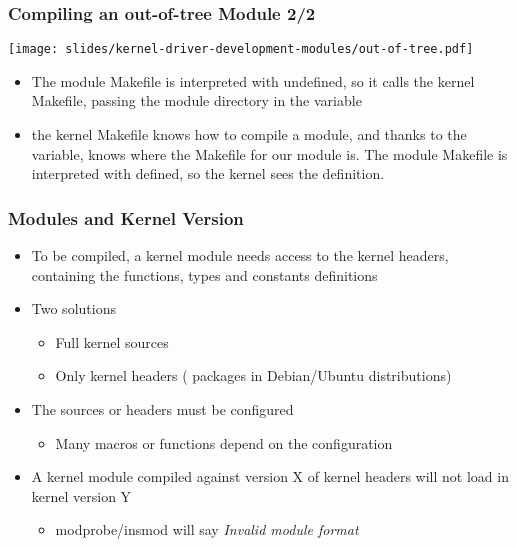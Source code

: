 \begin{frame}
  \frametitle{Compiling an out-of-tree Module 2/2}
  \begin{center}
    \texttt{[image: slides/kernel-driver-development-modules/out-of-tree.pdf]}
  \end{center}
  \begin{itemize}
  \item The module Makefile is interpreted with 
    undefined, so it calls the kernel Makefile, passing the module
    directory in the  variable
  \item the kernel Makefile knows how to compile a module, and thanks
    to the  variable, knows where the Makefile for our module
    is. The module Makefile is interpreted with 
    defined, so the kernel sees the  definition.
  \end{itemize}
\end{frame}

\begin{frame}
  \frametitle{Modules and Kernel Version}
  \begin{itemize}
  \item To be compiled, a kernel module needs access to the kernel
    headers, containing the functions, types and constants definitions
  \item Two solutions
    \begin{itemize}
    \item Full kernel sources
    \item Only kernel headers ( packages in
      Debian/Ubuntu distributions)
    \end{itemize}
  \item The sources or headers must be configured
    \begin{itemize}
    \item Many macros or functions depend on the configuration
    \end{itemize}
  \item A kernel module compiled against version X of kernel headers
    will not load in kernel version Y
    \begin{itemize}
    \item modprobe/insmod will say \emph{Invalid module format}
    \end{itemize}
  \end{itemize}
\end{frame}

